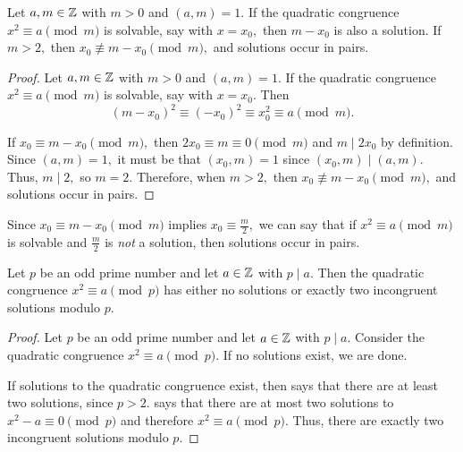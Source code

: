 \documentclass[letterpaper, 11 pt]{ximera}
\theoremstyle{definition}
\begin{document}
\begin{lem*}\label{lem:roots-pairs}
    Let $a,m\in\mathbb Z$ with $m>0$ and $(a,m)=1.$ If the quadratic congruence $x^2\equiv a\pmod{m}$ is solvable, say with $x=x_0,$ then  $m-x_0$ is also a solution. If $m\gt 2,$ then $x_0\not\equiv m-x_0\pmod{m},$ and solutions occur in pairs.
\end{lem*}

\begin{proof}
    Let $a,m\in\mathbb Z$ with $m>0$ and $(a,m)=1.$ If the quadratic congruence $x^2\equiv a\pmod{m}$ is solvable, say with $x=x_0.$ Then 
    \[(m-x_0)^2\equiv (-x_0)^2\equiv x_0^2\equiv a\pmod{m}.\]
    
    If $x_0\equiv m-x_0\pmod{m},$ then $2x_0\equiv m\equiv 0 \pmod{m}$ and $m\mid 2x_0$ by definition. Since $(a,m)=1,$ it must be that $(x_0,m)=1$ since $(x_0,m)\mid(a,m).$ Thus, $m\mid 2,$ so $m=2.$ Therefore, when  $m\gt 2,$ then $x_0\not\equiv m-x_0\pmod{m},$ and solutions occur in pairs.
\end{proof}


\begin{remark}
    Since $x_0\equiv m-x_0\pmod{m}$ implies $x_0\equiv \frac{m}{2},$ we can say that if $x^2\equiv a\pmod{m}$ is solvable and $\frac{m}{2}$ is \emph{not} a solution, then solutions occur in pairs.
\end{remark}

\begin{prop*}[Proposition 4.1]\label{prop:number-sqrts}
    Let $p$ be an odd prime number and let $a\in\mathbb Z$ with $p\mid a.$ Then the quadratic congruence $x^2\equiv a\pmod{p}$ has either no solutions or exactly two incongruent solutions modulo $p$.
\end{prop*}

\begin{proof}
	Let $p$ be an odd prime number and let $a\in\mathbb Z$ with $p\mid a.$ Consider the quadratic congruence $x^2\equiv a\pmod{p}.$ If no solutions exist, we are done.
	
	If solutions to the quadratic congruence exist, then  says that there are at least two solutions, since $p>2.$  says that there are at most two solutions to $x^2-a\equiv 0\pmod{p}$ and therefore $x^2\equiv a\pmod{p}.$ Thus, there are exactly two incongruent solutions modulo $p.$
\end{proof}
\end{document}
